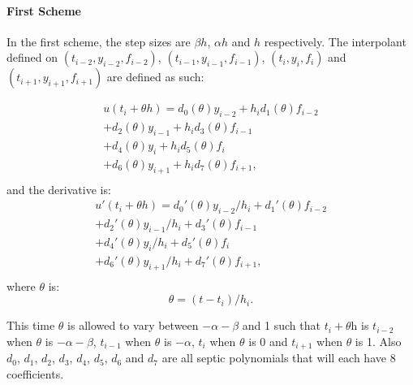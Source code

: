 \documentclass{article}
\begin{document}
\paragraph{First Scheme}
In the first scheme, the step sizes are $\beta h$, $\alpha h$ and $h$ respectively. The interpolant defined on $(t_{i-2}, y_{i-2}, f_{i-2})$, $(t_{i-1}, y_{i-1}, f_{i-1})$, $(t_i, y_i, f_i)$ and $(t_{i + 1}, y_{i + 1}, f_{i + 1})$ are defined as such:

\begin{equation}
\begin{split}
u(t_i + \theta h) = d_{0}(\theta)y_{i-2} +  h_id_{1}(\theta)f_{i-2} \\
+ d_{2}(\theta)y_{i-1}     +  h_id_{3}(\theta)f_{i-1} \\
+ d_{4}(\theta)y_i     +  h_id_{5}(\theta)f_i \\
+ d_{6}(\theta)y_{i + 1} + h_id_{7}(\theta)f_{i + 1}, \\
\end{split}
\end{equation}
and the derivative is:
\begin{equation}
\begin{split}
u'(t_i + \theta h) = d_{0}'(\theta)y_{i-2}/h_i +  d_{1}'(\theta)f_{i-2} \\
+ d_{2}'(\theta)y_{i-1}/h_i   +  d_{3}'(\theta)f_{i-1} \\
+ d_{4}'(\theta)y_i/h_i       +  d_{5}'(\theta)f_i \\
+ d_{6}'(\theta)y_{i + 1}/h_i +  d_{7}'(\theta)f_{i + 1}, \\
\end{split}
\end{equation}
where $\theta$ is:
\begin{equation}
\theta = (t - t_i) / h_i.
\end{equation}

This time $\theta$ is allowed to vary between $-\alpha-\beta$ and 1 such that $t_i + \theta$h is $t_{i-2}$ when $\theta$ is $-\alpha-\beta$, $t_{i-1}$ when $\theta$ is $-\alpha$, $t_i$ when $\theta$ is 0 and $t_{i + 1}$ when $\theta$ is 1. Also $d_0$, $d_1$, $d_2$, $d_3$, $d_4$, $d_5$, $d_6$ and $d_7$ are all septic polynomials that will each have 8 coefficients.
\end{document}

